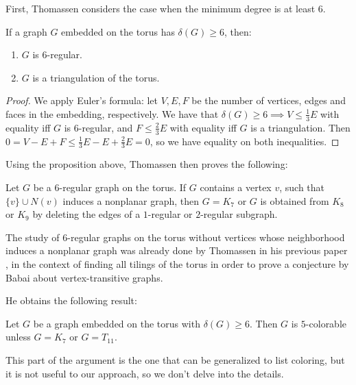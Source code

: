 First, Thomassen considers the case when the minimum degree is at least $6$. 

\begin{proposition}
If a graph $G$ embedded on the torus has $\delta(G) \geq 6$, then:

\begin{enumerate}
	\item $G$ is $6$-regular.
	\item $G$ is a triangulation of the torus.
\end{enumerate}
\end{proposition}

\begin{proof}
We apply Euler's formula: let $V, E, F$ be the number of vertices, edges and faces in the embedding, respectively. 
We have that $\delta(G) \geq 6 \implies V \leq \frac{1}{3} E$ with equality iff $G$ is $6$-regular, and $F \leq \frac{2}{3}E$ 
with equality iff $G$ is a triangulation. Then $0 = V - E + F \leq \frac{1}{3}E - E + \frac{2}{3}E = 0$, so we have equality on both inequalities.
\end{proof}

Using the proposition above, Thomassen then proves the following:

\begin{proposition}
Let $G$ be a $6$-regular graph on the torus. If $G$ contains a vertex $v$, such that $\{v\} \cup N(v)$ induces a nonplanar graph, then $G = K_7$ or $G$ is obtained from $K_8$ or $K_9$ by deleting the edges of a $1$-regular or $2$-regular subgraph.
\end{proposition}

The study of $6$-regular graphs on the torus without vertices whose neighborhood induces a nonplanar graph was already done by Thomassen in his previous paper \cite{thomassentilings}, in the context of finding all tilings of the torus in order to prove a conjecture by Babai about vertex-transitive graphs. 

He obtains the following result:

\begin{theorem}
Let $G$ be a graph embedded on the torus with $\delta(G) \geq 6$. Then $G$ is $5$-colorable 
unless $G = K_7$ or $G = T_{11}$.
\end{theorem}

This part of the argument is the one that can be generalized to list coloring, but it is not
useful to our approach, so we don't delve into the details. 

